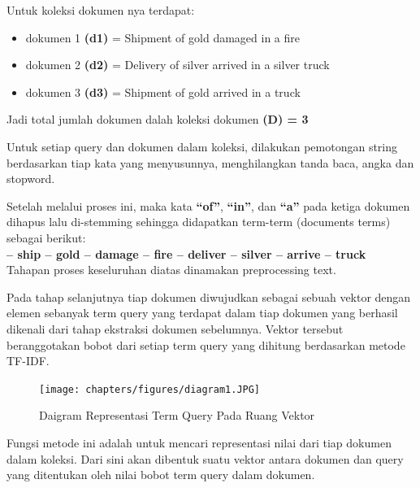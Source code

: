 Untuk koleksi dokumen nya terdapat:
\begin{itemize}
    \item dokumen 1 \textbf{(d1)} = Shipment of gold damaged in a fire
    \item dokumen 2 \textbf{(d2)} = Delivery of silver arrived in a silver truck
    \item dokumen 3 \textbf{(d3)} = Shipment of gold arrived in a truck
\end{itemize}

\par Jadi total jumlah dokumen dalah koleksi dokumen \textbf{(D) = 3}\\

\par Untuk setiap query dan dokumen dalam koleksi, dilakukan pemotongan string berdasarkan tiap kata yang menyusunnya, menghilangkan tanda baca, angka dan stopword.

\par Setelah melalui proses ini, maka kata \textbf{“of”}, \textbf{“in”}, dan \textbf{“a”} pada ketiga dokumen dihapus lalu di-stemming sehingga didapatkan term-term (documents terms) sebagai berikut:\\

\textbf{– ship – gold – damage – fire – deliver – silver – arrive – truck} \\

Tahapan proses keseluruhan diatas dinamakan preprocessing text.
\par Pada tahap selanjutnya tiap dokumen diwujudkan sebagai sebuah vektor dengan elemen sebanyak term query yang terdapat dalam tiap dokumen yang berhasil dikenali dari tahap ekstraksi dokumen sebelumnya. Vektor tersebut beranggotakan bobot dari setiap term query yang dihitung berdasarkan metode TF-IDF.

\begin{figure}[!htbp]
\centering
\texttt{[image: chapters/figures/diagram1.JPG]}
    \label{Figure4}
    \caption{Daigram Representasi Term Query Pada Ruang Vektor}
\end{figure}

\par Fungsi metode ini adalah untuk mencari representasi nilai dari tiap dokumen dalam koleksi. Dari sini akan dibentuk suatu vektor antara dokumen dan query yang ditentukan oleh nilai bobot term query dalam dokumen.

